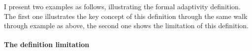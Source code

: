 I present two examples as follows, illustrating the formal adaptivity definition.
The first one illustrates the key concept of this definition through the same walk through example as above,
the second one shows the limitation of this definition.


\paragraph{The definition limitation}
